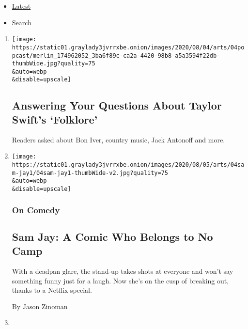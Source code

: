 \begin{itemize}
\tightlist
\item
  \protect\hyperlink{stream-panel}{Latest}
\item
  Search
\end{itemize}

\begin{enumerate}
\def\labelenumi{\arabic{enumi}.}
\item
  \href{/2020/08/04/arts/music/taylor-swift-folklore-questions.html}{}

  \texttt{[image: https://static01.graylady3jvrrxbe.onion/images/2020/08/04/arts/04popcast/merlin\_174962052\_3ba6f89c-ca2a-4420-98b8-a5a3594f22db-thumbWide.jpg?quality=75\\\&auto=webp\\\&disable=upscale]}

  \hypertarget{answering-your-questions-about-taylor-swifts-folklore}{%
  \subsection{Answering Your Questions About Taylor Swift's
  `Folklore'}\label{answering-your-questions-about-taylor-swifts-folklore}}

  Readers asked about Bon Iver, country music, Jack Antonoff and more.
\item
  \href{/2020/08/04/arts/television/sam-jay-netflix-special.html}{}

  \texttt{[image: https://static01.graylady3jvrrxbe.onion/images/2020/08/05/arts/04sam-jay1/04sam-jay1-thumbWide-v2.jpg?quality=75\\\&auto=webp\\\&disable=upscale]}

  \hypertarget{on-comedy}{%
  \subsubsection{On Comedy}\label{on-comedy}}

  \hypertarget{sam-jay-a-comic-who-belongs-to-no-camp}{%
  \subsection{Sam Jay: A Comic Who Belongs to No
  Camp}\label{sam-jay-a-comic-who-belongs-to-no-camp}}

  With a deadpan glare, the stand-up takes shots at everyone and won't
  say something funny just for a laugh. Now she's on the cusp of
  breaking out, thanks to a Netflix special.

  By Jason Zinoman
\item
  \href{/2020/08/04/arts/television/the-good-fight-the-split.html}{}


\end{enumerate}
